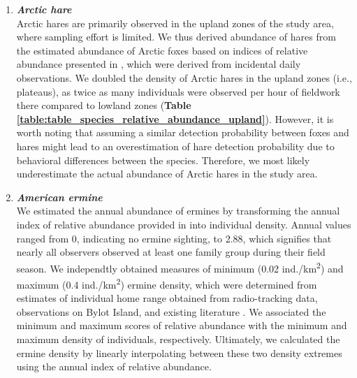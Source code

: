 \documentclass[a4paper,twoside,12pt]{article}
\begin{document}
\begin{enumerate}[label=\alph*.]
                \item[] \textit{\textbf{Arctic hare}}\\
                Arctic hares are primarily observed in the upland zones of the study area, where sampling effort is limited. We thus derived abundance of hares from the estimated abundance of Arctic foxes based on indices of relative abundance presented in \citep{gauthier2024a}, which were derived from incidental daily observations. We doubled the density of Arctic hares in the upland zones (i.e., plateaus), as twice as many individuals were observed per hour of fieldwork there compared to lowland zones (\textbf{Table \ref{table:table_species_relative_abundance_upland}}). However, it is worth noting that assuming a similar detection probability between foxes and hares might lead to an overestimation of hare detection probability due to behavioral differences between the species. Therefore, we most likely underestimate the actual abundance of Arctic hares in the study area.
                
                \item[] \textit{\textbf{American ermine}}\\
   				We estimated the annual abundance of ermines by transforming the annual index of relative abundance provided in \citet{bolduc2023} into individual density. Annual values ranged from 0, indicating no ermine sighting, to 2.88, which signifies that nearly all observers observed at least one family group during their field season. We independtly obtained measures of minimum (0.02 ind./km\textsuperscript{2}) and maximum (0.4 ind./km\textsuperscript{2}) ermine density, which were determined from estimates of individual home range obtained from radio-tracking data, observations on Bylot Island, and existing literature \citep{legagneux2012, bilodeau2013}. We associated the minimum and maximum scores of relative abundance with the minimum and maximum density of individuals, respectively. Ultimately, we calculated the ermine density by linearly interpolating between these two density extremes using the annual index of relative abundance.
                

\end{enumerate}
\end{document}
